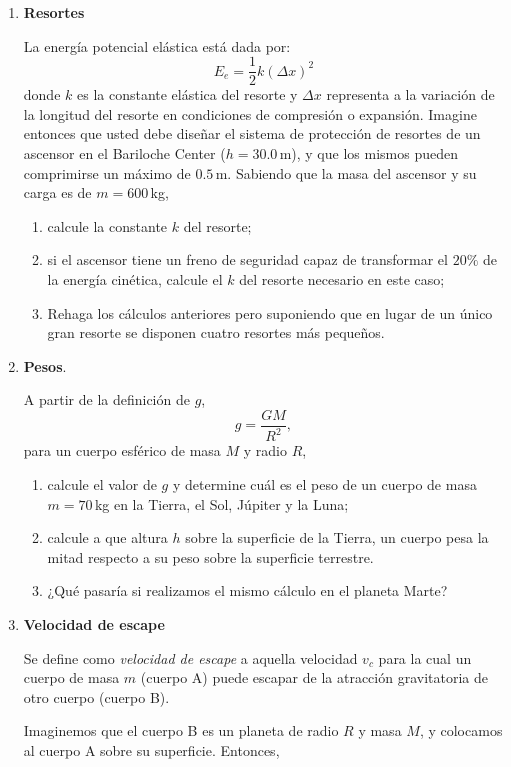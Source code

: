 \documentclass[a4paper,12pt]{article}
\begin{document}
\begin{enumerate}
\item{\bf{Resortes}}

La energía potencial elástica está dada por:
\[E_e = \frac{1}{2} k (\Delta x)^2 \]
donde $k$ es la constante elástica del resorte y $\Delta x$ representa a la
variación de la longitud del resorte en condiciones de compresión o expansión.
Imagine entonces que usted debe diseñar el sistema de protección de resortes de
un ascensor en el Bariloche Center ($h=30.0$\,m), y que los mismos pueden
comprimirse un máximo de $0.5$\,m. Sabiendo que la masa del ascensor y su carga
es de $m=600$\,kg, 

\begin{enumerate}
\item calcule la constante $k$ del resorte;
\item si el ascensor tiene un freno de seguridad capaz de transformar el $20\%$ de
la energía cinética, calcule el $k$ del resorte necesario en este caso;
\item Rehaga los cálculos anteriores pero suponiendo que en lugar de un único
gran resorte se disponen cuatro resortes más pequeños. 
\end{enumerate}

\item {\bf{Pesos}}.

A partir de la definición de $g$, 
\[
g=\frac{GM}{R^2},
\]
para un cuerpo esférico de masa $M$ y radio $R$, 
\begin{enumerate}
\item calcule el valor de $g$ y determine cuál es el peso de un cuerpo de masa
$m=70$\,kg en la Tierra, el Sol, Júpiter y la Luna; 
\item calcule a que altura $h$ sobre la superficie de la Tierra, un cuerpo pesa la mitad respecto a su peso sobre la superficie terrestre. 
\item ¿Qué pasaría si realizamos el mismo cálculo en el planeta Marte?
\end{enumerate}

\item {\bf{Velocidad de escape}}

Se define como {\emph{velocidad de escape}} a aquella velocidad $v_c$ para la
cual un cuerpo de masa $m$ (cuerpo A) puede escapar de la atracción gravitatoria
de otro cuerpo (cuerpo B).

Imaginemos que el cuerpo B es un planeta de radio $R$ y masa $M$, y colocamos al
cuerpo A sobre su superficie. Entonces,
 

\end{enumerate}
\end{document}
